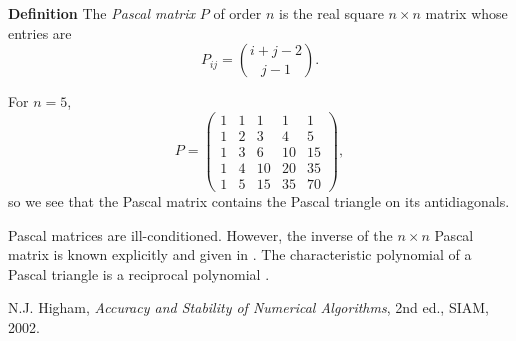 \documentclass[12pt]{article}
\begin{document}
{\bf Definition} The \emph{Pascal matrix} $P$ of order $n$ is the real 
square $n\times n$ matrix whose entries are \cite{higham}
 $$ P_{ij} = { i+j-2 \choose j-1}. $$
 
For $n=5$, 
 $$P= \begin{pmatrix}
1 & 1 & 1 & 1  & 1\\
1 & 2 & 3 & 4  & 5 \\
1 & 3 & 6 & 10  & 15\\
1 & 4 & 10 & 20 & 35 \\
1 & 5 & 15 & 35 & 70 
\end{pmatrix}, $$
so we see that the Pascal matrix contains the Pascal triangle on its antidiagonals.
 
Pascal matrices are ill-conditioned. However, the inverse of the
$n\times n$ Pascal matrix is known explicitly and given in \cite{higham}.
The characteristic polynomial of a Pascal triangle is a reciprocal 
polynomial \cite{higham}.

\begin{thebibliography}{9}
  N.J. Higham, \emph{Accuracy and Stability of Numerical Algorithms},
 2nd ed., SIAM, 2002.
 \end{thebibliography}
\end{document}
